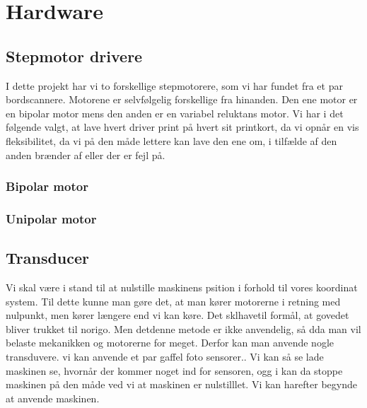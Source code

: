 \chapter{Hardware}


\section{Stepmotor drivere}
I dette projekt har vi to forskellige stepmotorere, som vi har fundet
fra et par bordscannere. Motorene er selvfølgelig forskellige fra
hinanden. Den ene motor er en bipolar motor mens den anden er en
variabel reluktans motor. Vi har i det følgende valgt, at lave hvert
driver print på hvert sit printkort, da vi opnår en vis fleksibilitet,
da vi på den måde lettere kan lave den ene om, i tilfælde af den anden
brænder af eller der er fejl på. 

\subsection{Bipolar motor}

\subsection{Unipolar motor}

 

\section{Transducer}
Vi skal være i stand til at nulstille maskinens psition i forhold til
vores koordinat system. Til dette kunne man gøre det, at man kører
motorerne i retning med nulpunkt, men kører længere end vi kan
køre. Det sklhavetil formål, at govedet bliver trukket til norigo. Men
detdenne metode er ikke anvendelig, så dda man vil belaste mekanikken
og motorerne for meget. Derfor kan man anvende nogle transduvere. vi
kan anvende et par gaffel foto sensorer.. Vi kan så se lade maskinen
se, hvornår der kommer noget ind for sensoren, ogg i kan da stoppe
maskinen på den måde ved vi at maskinen er nulstilllet. Vi kan
harefter begynde at anvende maskinen.  

